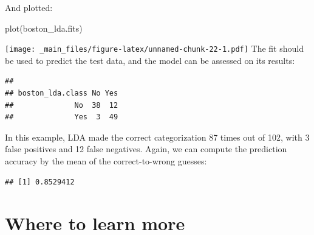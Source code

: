 \documentclass[
]{book}
\newenvironment{Shaded}{\begin{snugshade}}{\end{snugshade}}
\newcommand{\FunctionTok}[1]{\textcolor[rgb]{0.00,0.00,0.00}{#1}}
\newcommand{\NormalTok}[1]{#1}
\newcommand{\OtherTok}[1]{\textcolor[rgb]{0.56,0.35,0.01}{#1}}
\newcommand{\SpecialCharTok}[1]{\textcolor[rgb]{0.00,0.00,0.00}{#1}}
\begin{document}
And plotted:

\begin{Shaded}
\begin{Highlighting}[]
\FunctionTok{plot}\NormalTok{(boston\_lda.fits)}
\end{Highlighting}
\end{Shaded}

\texttt{[image: \_main\_files/figure-latex/unnamed-chunk-22-1.pdf]}
The fit should be used to predict the test data, and the model can be assessed on its results:

\begin{Shaded}
\end{Shaded}

\begin{verbatim}
##                 
## boston_lda.class No Yes
##              No  38  12
##              Yes  3  49
\end{verbatim}

In this example, LDA made the correct categorization 87 times out of 102, with 3 false positives and 12 false negatives. Again, we can compute the prediction accuracy by the mean of the correct-to-wrong guesses:

\begin{Shaded}
\end{Shaded}

\begin{verbatim}
## [1] 0.8529412
\end{verbatim}

\hypertarget{where-to-learn-more-3}{%
\section{Where to learn more}\label{where-to-learn-more-3}}
\end{document}
